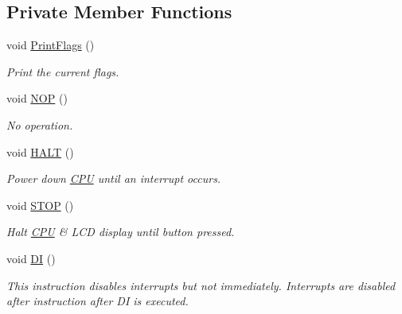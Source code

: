 \subsection*{Private Member Functions}
\begin{DoxyCompactItemize}
\item 
void \mbox{\hyperlink{classCPU_ad9a3c63b18e3bb12000972e2def9fec8}{Print\+Flags}} ()
\begin{DoxyCompactList}\small\item\em Print the current flags. \end{DoxyCompactList}\item 
\mbox{\label{classCPU_a55c54eab08fe12217e0d3677a926c2c6}} 
void \mbox{\hyperlink{classCPU_a55c54eab08fe12217e0d3677a926c2c6}{N\+OP}} ()
\begin{DoxyCompactList}\small\item\em No operation. \end{DoxyCompactList}\item 
\mbox{\label{classCPU_a456c873690c0f8c62b76b89d9fd16525}} 
void \mbox{\hyperlink{classCPU_a456c873690c0f8c62b76b89d9fd16525}{H\+A\+LT}} ()
\begin{DoxyCompactList}\small\item\em Power down \mbox{\hyperlink{classCPU}{C\+PU}} until an interrupt occurs. \end{DoxyCompactList}\item 
\mbox{\label{classCPU_a8ed63198ab9a5279a31d1cc08b570b45}} 
void \mbox{\hyperlink{classCPU_a8ed63198ab9a5279a31d1cc08b570b45}{S\+T\+OP}} ()
\begin{DoxyCompactList}\small\item\em Halt \mbox{\hyperlink{classCPU}{C\+PU}} \& L\+CD display until button pressed. \end{DoxyCompactList}\item 
\mbox{\label{classCPU_a217c8595939e14e186f8185a50eea778}} 
void \mbox{\hyperlink{classCPU_a217c8595939e14e186f8185a50eea778}{DI}} ()
\begin{DoxyCompactList}\small\item\em This instruction disables interrupts but not immediately. Interrupts are disabled after instruction after DI is executed. \end{DoxyCompactList}\item 

\end{DoxyCompactItemize}

